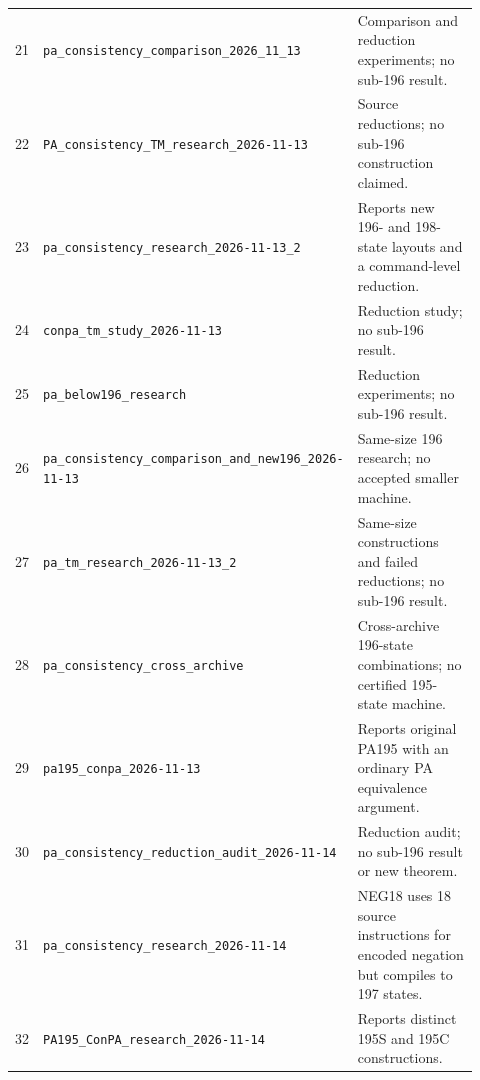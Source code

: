 {\begin{longtable}{@{}r >{\raggedright\arraybackslash}p{0.36\linewidth} >{\raggedright\arraybackslash}p{0.56\linewidth}@{}}
21 & \texttt{pa\_\allowbreak{}consistency\_\allowbreak{}comparison\_\allowbreak{}2026\_\allowbreak{}11\_\allowbreak{}13} & Comparison and reduction experiments; no sub-196 result.\\[3pt]
22 & \texttt{PA\_\allowbreak{}consistency\_\allowbreak{}TM\_\allowbreak{}research\_\allowbreak{}2026-\allowbreak{}11-\allowbreak{}13} & Source reductions; no sub-196 construction claimed.\\[3pt]
23 & \texttt{pa\_\allowbreak{}consistency\_\allowbreak{}research\_\allowbreak{}2026-\allowbreak{}11-\allowbreak{}13\_\allowbreak{}2} & Reports new 196- and 198-state layouts and a command-level reduction.\\[3pt]
24 & \texttt{conpa\_\allowbreak{}tm\_\allowbreak{}study\_\allowbreak{}2026-\allowbreak{}11-\allowbreak{}13} & Reduction study; no sub-196 result.\\[3pt]
25 & \texttt{pa\_\allowbreak{}below196\_\allowbreak{}research} & Reduction experiments; no sub-196 result.\\[3pt]
26 & \texttt{pa\_\allowbreak{}consistency\_\allowbreak{}comparison\_\allowbreak{}and\_\allowbreak{}new196\_\allowbreak{}2026-\allowbreak{}11-\allowbreak{}13} & Same-size 196 research; no accepted smaller machine.\\[3pt]
27 & \texttt{pa\_\allowbreak{}tm\_\allowbreak{}research\_\allowbreak{}2026-\allowbreak{}11-\allowbreak{}13\_\allowbreak{}2} & Same-size constructions and failed reductions; no sub-196 result.\\[3pt]
28 & \texttt{pa\_\allowbreak{}consistency\_\allowbreak{}cross\_\allowbreak{}archive} & Cross-archive 196-state combinations; no certified 195-state machine.\\[3pt]
29 & \texttt{pa195\_\allowbreak{}conpa\_\allowbreak{}2026-\allowbreak{}11-\allowbreak{}13} & Reports original PA195 with an ordinary PA equivalence argument.\\[3pt]
30 & \texttt{pa\_\allowbreak{}consistency\_\allowbreak{}reduction\_\allowbreak{}audit\_\allowbreak{}2026-\allowbreak{}11-\allowbreak{}14} & Reduction audit; no sub-196 result or new theorem.\\[3pt]
31 & \texttt{pa\_\allowbreak{}consistency\_\allowbreak{}research\_\allowbreak{}2026-\allowbreak{}11-\allowbreak{}14} & NEG18 uses 18 source instructions for encoded negation but compiles to 197 states.\\[3pt]
32 & \texttt{PA195\_\allowbreak{}ConPA\_\allowbreak{}research\_\allowbreak{}2026-\allowbreak{}11-\allowbreak{}14} & Reports distinct 195S and 195C constructions.\\[3pt]

\end{longtable}}
